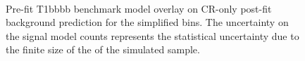 \begin{figure}[!h]
    \centering
     \\
    \caption{
        Pre-fit T1bbbb benchmark model overlay on CR-only post-fit
        background prediction for the simplified bins. The uncertainty on
        the signal model counts represents the statistical uncertainty due
        to the finite size of the of the simulated sample.
    }
    \label{fig:T1bbbb_MR_simp}
\end{figure}


